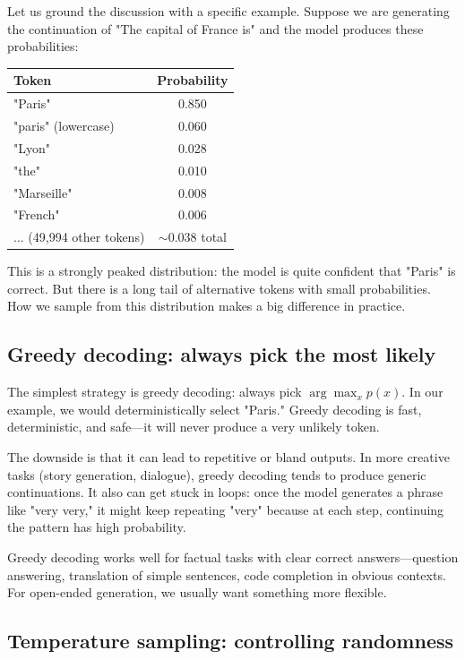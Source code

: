 Let us ground the discussion with a specific example. Suppose we are generating the continuation of "The capital of France is" and the model produces these probabilities:

\begin{center}
\begin{tabular}{lc}
\toprule
\textbf{Token} & \textbf{Probability} \\
\midrule
"Paris" & 0.850 \\
"paris" (lowercase) & 0.060 \\
"Lyon" & 0.028 \\
"the" & 0.010 \\
"Marseille" & 0.008 \\
"French" & 0.006 \\
... (49,994 other tokens) & $\sim$0.038 total \\
\bottomrule
\end{tabular}
\end{center}

This is a strongly peaked distribution: the model is quite confident that "Paris" is correct. But there is a long tail of alternative tokens with small probabilities. How we sample from this distribution makes a big difference in practice.

\subsection{Greedy decoding: always pick the most likely}
\label{sec:greedy}

The simplest strategy is greedy decoding: always pick $\arg\max_x p(x)$. In our example, we would deterministically select "Paris." Greedy decoding is fast, deterministic, and safe---it will never produce a very unlikely token.

The downside is that it can lead to repetitive or bland outputs. In more creative tasks (story generation, dialogue), greedy decoding tends to produce generic continuations. It also can get stuck in loops: once the model generates a phrase like "very very," it might keep repeating "very" because at each step, continuing the pattern has high probability.

Greedy decoding works well for factual tasks with clear correct answers---question answering, translation of simple sentences, code completion in obvious contexts. For open-ended generation, we usually want something more flexible.

\subsection{Temperature sampling: controlling randomness}
\label{sec:temperature_sampling}


